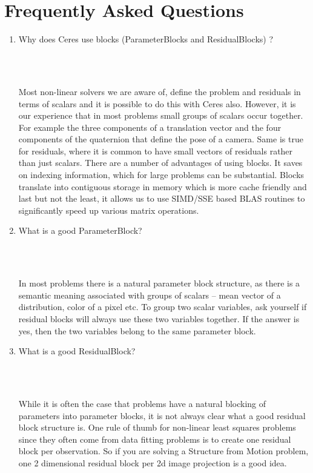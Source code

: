 \chapter{Frequently Asked Questions}
\label{chapter:faq}

\begin{enumerate}
\item \begin{Question}
Why does Ceres use blocks (ParameterBlocks and ResidualBlocks) ?
\end{Question}\\ \\
\begin{Answer}
Most non-linear solvers we are aware of, define the problem and residuals in terms of scalars and it is possible to do this with Ceres also. However, it is our experience that in most problems small groups of scalars occur together. For example the three components of a translation vector and the four components of the quaternion that define the pose of a camera. Same is true for residuals, where it is common to have small vectors of residuals rather than just scalars. There are a number of advantages of using blocks. It saves on indexing information, which for large problems can be substantial. Blocks translate into contiguous storage in memory which is more cache friendly and last but not the least, it allows us to use SIMD/SSE based BLAS routines to significantly speed up various matrix operations.
\end{Answer}

\item \begin{Question}
	What is a good ParameterBlock?
\end{Question}\\ \\
\begin{Answer}
In most problems there is a natural parameter block structure, as there is a semantic meaning associated with groups of scalars -- mean vector of a distribution, color of a pixel etc. To group two scalar variables,  ask yourself if residual blocks will always use these two variables together. If the answer is yes, then the two variables belong to the same parameter block.
\end{Answer}

\item \begin{Question}
	What is a good ResidualBlock?
\end{Question}\\ \\
\begin{Answer}
While it is often the case that problems have a natural blocking of parameters into parameter blocks, it is not always clear what a good residual block structure is.  One rule of thumb for non-linear least squares problems since they often come from data fitting problems is to create one residual block per observation. So if you are solving a Structure from Motion problem, one 2 dimensional residual block per 2d image projection is a good idea.


\end{Answer}
\end{enumerate}

